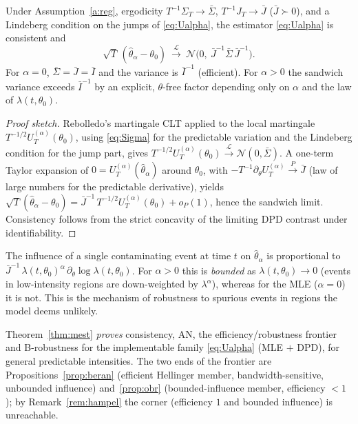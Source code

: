 \documentclass[smallextended,natbib]{svjour3}
\newcommand{\toP}{\xrightarrow{P}}
\newcommand{\toL}{\xrightarrow{\mathcal{L}}}
\begin{document}
\begin{theorem}
\label{thm:mest}
Under Assumption~\ref{a:reg}, ergodicity $T^{-1}\Sigma_T\to\bar\Sigma$,
$T^{-1}J_T\to\bar J$ ($\bar J\succ0$), and a Lindeberg condition on the jumps of
\eqref{eq:Ualpha}, the estimator \eqref{eq:Ualpha} is consistent and
\[
\sqrt T\,(\hat\theta_\alpha-\theta_0)\ \toL\ \mathcal N\!\big(0,\ \bar J^{-1}\bar\Sigma\,\bar J^{-1}\big).
\]
For $\alpha=0$, $\bar\Sigma=\bar J=\bar I$ and the variance is $\bar I^{-1}$
(efficient). For $\alpha>0$ the sandwich variance exceeds $\bar I^{-1}$ by an
explicit, $\theta$-free factor depending only on $\alpha$ and the law of
$\lambda(t,\theta_0)$.
\end{theorem}
\begin{proof}[Proof sketch]
Rebolledo's martingale CLT \citep{rebolledo1980,abgk1993} applied to the
local martingale $T^{-1/2}U_T^{(\alpha)}(\theta_0)$, using
\eqref{eq:Sigma} for the predictable variation and the Lindeberg condition for
the jump part, gives $T^{-1/2}U_T^{(\alpha)}(\theta_0)\toL\mathcal N(0,\bar\Sigma)$.
A one-term Taylor expansion of $0=U_T^{(\alpha)}(\hat\theta_\alpha)$ around
$\theta_0$, with $-T^{-1}\partial_\theta U_T^{(\alpha)}\toP\bar J$ (law of large
numbers for the predictable derivative), yields
$\sqrt T(\hat\theta_\alpha-\theta_0)=\bar J^{-1}\,T^{-1/2}U_T^{(\alpha)}(\theta_0)+o_P(1)$,
hence the sandwich limit. Consistency follows from the strict concavity of the
limiting DPD contrast under identifiability.
\end{proof}

\begin{proposition}\label{prop:if2}
The influence of a single contaminating event at time $t$ on
$\hat\theta_\alpha$ is proportional to
$\bar J^{-1}\,\lambda(t,\theta_0)^{\alpha}\,\partial_\theta\log\lambda(t,\theta_0)$.
For $\alpha>0$ this is \emph{bounded} as $\lambda(t,\theta_0)\to0$ (events in
low-intensity regions are down-weighted by $\lambda^{\alpha}$), whereas for the
MLE ($\alpha=0$) it is not. This is the mechanism of robustness to spurious
events in regions the model deems unlikely.
\end{proposition}

\begin{remark}
Theorem~\ref{thm:mest} \emph{proves} consistency, AN, the
efficiency/robustness frontier and B-robustness for the implementable family
\eqref{eq:Ualpha} (MLE $+$ DPD), for general predictable intensities. The two ends
of the frontier are Propositions~\ref{prop:beran} (efficient Hellinger member,
bandwidth-sensitive, unbounded influence) and~\ref{prop:obr} (bounded-influence
member, efficiency $<1$); by Remark~\ref{rem:hampel} the corner
(efficiency $1$ and bounded influence) is unreachable.
\end{remark}
\end{document}
